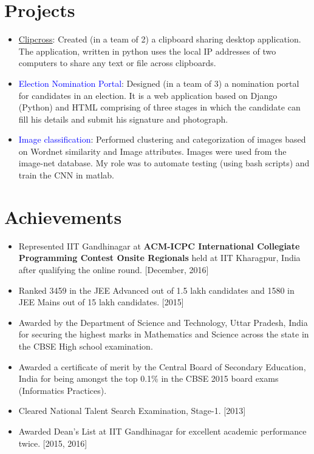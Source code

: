 \documentclass[margin, centered]{res}
\begin{document}
\begin{resume}
\section{Projects}
\begin{itemize}[leftmargin=*]
\item \href{https://github.com/arikpamnani/clipcross}{Clipcross}: Created (in a team of 2) a clipboard sharing desktop application. The application, written in python uses the local IP addresses of two computers to share any text or file across clipboards.

\item \textcolor{blue}{Election Nomination Portal}: Designed (in a team of 3) a nomination portal for candidates in an election. It is a web application based on Django (Python) and HTML comprising of three stages in which the candidate can fill his details and submit his signature and photograph.

\item \textcolor{blue}{Image classification}: Performed clustering and categorization of images based on Wordnet similarity and Image attributes. Images were used from the image-net database. My role was to automate testing (using bash scripts) and train the CNN in matlab. 

\end{itemize}

\section{Achievements}
\begin{itemize}[leftmargin=*]
\item Represented IIT Gandhinagar at {\bf ACM-ICPC International Collegiate Programming Contest Onsite Regionals} held at IIT Kharagpur, India after qualifying the online round. 
\hfill {[December, 2016]}
\item Ranked 3459 in the JEE Advanced out of 1.5 lakh candidates and 1580 in JEE Mains out of 15 lakh candidates.
\hfill {[2015]}
\item Awarded by the Department of Science and Technology, Uttar Pradesh, India for securing the highest marks in Mathematics and Science across the state in the CBSE High school examination.
\item Awarded a certificate of merit by the Central Board of Secondary Education, India for being amongst the top 0.1\% in the CBSE 2015 board exams (Informatics Practices).
\item Cleared National Talent Search Examination, Stage-1. \hfill{[2013]}
\item Awarded Dean{'}s List at IIT Gandhinagar for excellent academic performance twice. \hfill{[2015, 2016]}
\end{itemize}

\end{resume}
\end{document}
